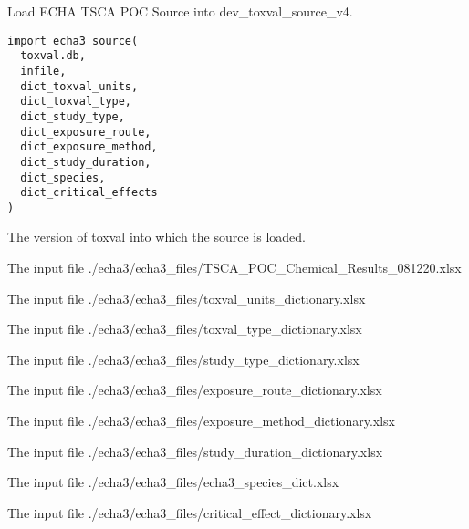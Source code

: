 \documentclass[letterpaper]{book}
\begin{document}
%
\begin{Description}\relax
Load ECHA TSCA POC Source into dev\_toxval\_source\_v4.
\end{Description}
%
\begin{Usage}
\begin{verbatim}
import_echa3_source(
  toxval.db,
  infile,
  dict_toxval_units,
  dict_toxval_type,
  dict_study_type,
  dict_exposure_route,
  dict_exposure_method,
  dict_study_duration,
  dict_species,
  dict_critical_effects
)
\end{verbatim}
\end{Usage}
%
\begin{Arguments}
\begin{ldescription}
\item[\code{toxval.db}] The version of toxval into which the source is loaded.

\item[\code{infile}] The input file ./echa3/echa3\_files/TSCA\_POC\_Chemical\_Results\_081220.xlsx

\item[\code{dict\_toxval\_units}] The input file ./echa3/echa3\_files/toxval\_units\_dictionary.xlsx

\item[\code{dict\_toxval\_type}] The input file ./echa3/echa3\_files/toxval\_type\_dictionary.xlsx

\item[\code{dict\_study\_type}] The input file ./echa3/echa3\_files/study\_type\_dictionary.xlsx

\item[\code{dict\_exposure\_route}] The input file ./echa3/echa3\_files/exposure\_route\_dictionary.xlsx

\item[\code{dict\_exposure\_method}] The input file ./echa3/echa3\_files/exposure\_method\_dictionary.xlsx

\item[\code{dict\_study\_duration}] The input file ./echa3/echa3\_files/study\_duration\_dictionary.xlsx

\item[\code{dict\_species}] The input file ./echa3/echa3\_files/echa3\_species\_dict.xlsx

\item[\code{dict\_critical\_effects}] The input file ./echa3/echa3\_files/critical\_effect\_dictionary.xlsx
\end{ldescription}
\end{Arguments}
\end{document}
